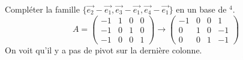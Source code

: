 \begin{exemple}
    Compléter la famille $\{\vec{e_2} -\vec{e_1}, \vec{e_3} -\vec{e_1}, \vec{e_4} - \vec{e_1}\}$ en un base de \R$^4$.
    \[A = \begin{pmatrix}
        -1 & 1 & 0 & 0 \\
        -1&0&1 & 0\\
        -1&0&0 & 1
    \end{pmatrix}\to \begin{pmatrix}
        -1 & 0 & 0 & 1 \\
        0&1&0 & -1\\
        0&0&1 & -1
    \end{pmatrix} \]
    On voit qu'il y a pas de pivot sur la dernière colonne.
\end{exemple}


